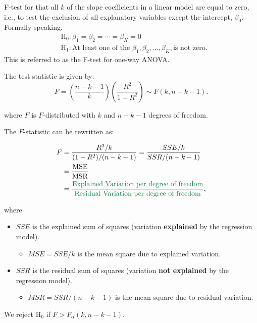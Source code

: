 \documentclass[
  12pt,
  letterpaper,
]{scrbook}
\providecommand{\tightlist}{%
  \setlength{\itemsep}{0pt}\setlength{\parskip}{0pt}}
\newcommand{\green}[1]{\color[RGB]{0, 139, 69}{#1}}
\renewcommand{\tightlist}{\setlength{\itemsep}{0.5\baselineskip}\setlength{\parskip}{0.2\baselineskip}}
\theoremstyle{definition}
\theoremstyle{plain}
\theoremstyle{remark}
\begin{document}
F-test for that all \(k\) of the slope coefficients in a linear model
are equal to zero, i.e., to test the exclusion of all explanatory
variables {except the intercept}, \(\beta_0\). Formally speaking. \[
\begin{aligned}
&\text{H}_0: \beta_1 = \beta_2 = \cdots = \beta_K=0 \\
&\text{H}_1: \text{At least one of the } \beta_1, \beta_2,\ldots, \beta_K,\text{is not zero.}
\end{aligned}
\] This is referred to as the {F-test} for {one-way ANOVA}.

The test statistic is given by: \[
F = \left(\frac{n-k-1}{k}\right) \left(\frac{R^2}{1-R^2}\right) \sim F(k, n-k-1) .
\]

where \(F\) is \(F\)-distributed with \(k\) and \(n-k-1\) degrees of
freedom.

The \(F\)-statistic can be rewritten as:

\[
\begin{split}
F &= \frac{R^2/k}{(1-R^2)/(n-k-1)} = \frac{SSE/k}{SSR/(n-k-1)} \\
&= \frac{\text{MSE}}{\text{MSR}} \\
& = \frac{\text{\green{Explained} Variation per degree of freedom}}{\text{\green{Residual} Variation per degree of freedom}} ,
\end{split}
\]

where

\begin{itemize}
\tightlist
\item
  \(SSE\) is the explained sum of squares (variation \textbf{explained}
  by the regression model).

  \begin{itemize}
  \tightlist
  \item
    \(MSE = SSE/k\) is the mean square due to explained variation.
  \end{itemize}
\item
  \(SSR\) is the residual sum of squares (variation \textbf{not
  explained} by the regression model).

  \begin{itemize}
  \tightlist
  \item
    \(MSR = SSR/(n-k-1)\) is the mean square due to residual variation.
  \end{itemize}
\end{itemize}

We reject \(\text{H}_0\) if \(F>F_{\alpha}(k, n-k-1)\).
\end{document}

